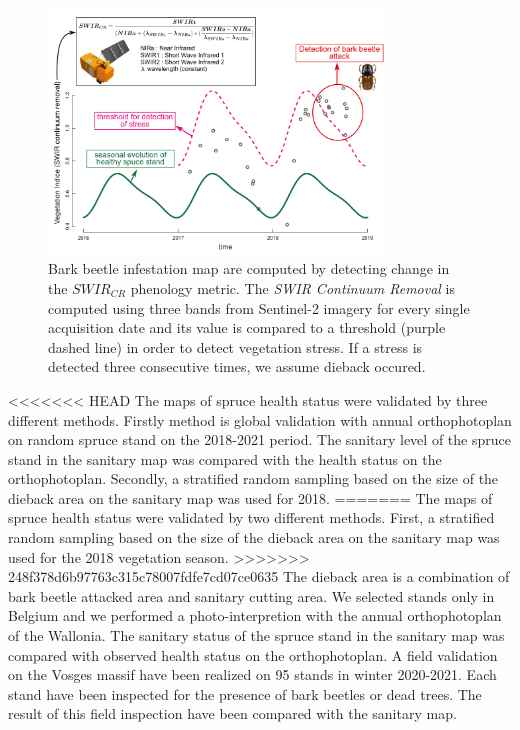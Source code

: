 \documentclass[3p,procedia]{elsarticle}
\begin{document}
\begin{figure}[htbp] 
	\centering
	\includegraphics[width=0.8\textwidth]{fctHarmo.png}
	\caption{Bark beetle infestation map are computed by detecting change in the $SWIR_{CR}$ phenology metric. The \textit{SWIR Continuum Removal} is computed using three bands from Sentinel-2 imagery for every single acquisition date and its value is compared to a threshold (purple dashed line) in order to detect vegetation stress. If a stress is detected three consecutive times, we assume dieback occured.}
	\label{fig:harmo}
\end{figure}


<<<<<<< HEAD
The maps of spruce health status were validated by three different methods.
Firstly method is global validation with annual orthophotoplan on random spruce stand on the 2018-2021 period. The sanitary level of the spruce stand in the sanitary map was compared with the health status on the orthophotoplan.
Secondly, a stratified random sampling based on the size of the dieback area on the sanitary map was used for 2018.
=======
The maps of spruce health status were validated by two different methods.
First, a stratified random sampling based on the size of the dieback area on the sanitary map was used for the 2018 vegetation season.
>>>>>>> 248f378d6b97763c315c78007fdfe7cd07ce0635
The dieback area is a combination of bark beetle attacked area and sanitary cutting area. 
We selected stands only in Belgium and we performed a photo-interpretion with the annual orthophotoplan of the Wallonia. The sanitary status of the spruce stand in the sanitary map was compared with observed health status on the orthophotoplan.
A field validation on the Vosges massif have been realized on 95 stands in winter 2020-2021.
Each stand have been inspected for the presence of bark beetles or dead trees. 
The result of this field inspection have been compared with the sanitary map. 
\end{document}
